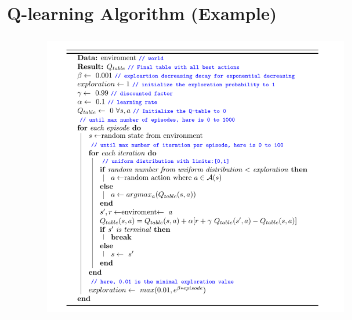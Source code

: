 \begin{frame}
    \frametitle{Q-learning Algorithm (Example)}
    \begin{figure}
        \centering
        \includegraphics[width=0.7\textwidth]{sections/optimization/figures/q_learning_alg.pdf}
    \end{figure}
\end{frame}



